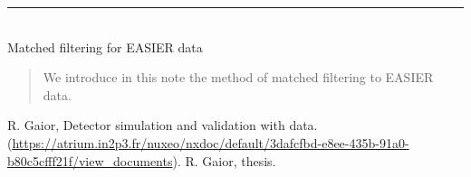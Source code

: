 \documentclass[twoside, final, 11pt]{articleMine}
\begin{document}
\modulolinenumbers[2]



\renewcommand\linenumberfont{\small\rmfamily}
\begin{center}
  \vspace*{-13ex}

  \rule{\linewidth}{0.1mm}  \\[17mm] {\huge  Matched filtering for EASIER data}
     \begin{flushright}
       \small 
     
     \end{flushright}

\end{center}
% 
\vspace*{2ex} 
%
\thispagestyle{empty}
\noindent
\begin{abstract}
  \noindent
We introduce in this note the method of matched filtering to EASIER data.
\end{abstract}

%
\thispagestyle{empty}
\noindent





\begin{thebibliography}{9}
 R.  Gaior, Detector simulation  and validation with
  data. (\url{https://atrium.in2p3.fr/nuxeo/nxdoc/default/3dafcfbd-e8ee-435b-91a0-b80c5cfff21f/view_documents}).
 R. Gaior, thesis.
\end{thebibliography}
\end{document}
